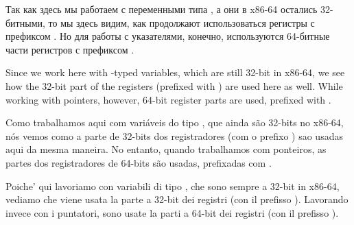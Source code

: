 

\ifdefined\RUSSIAN
Так как здесь мы работаем с переменными типа \Tint, а они в x86-64 остались 32-битными, то мы здесь видим, как продолжают использоваться регистры с префиксом .
Но для работы с указателями, конечно, используются 64-битные части регистров с префиксом .


\fi

\ifdefined\ENGLISH
Since we work here with \Tint{}-typed variables, which are still 32-bit in x86-64, we see how the 32-bit part of the registers (prefixed with ) are used here as well.
While working with pointers, however, 64-bit register parts are used, prefixed with .


\fi

\ifdefined\BRAZILIAN
Como trabalhamos aqui com variáveis do tipo \Tint, que ainda são 32-bits no x86-64, nós vemos como a parte de 32-bits dos registradores (com o prefixo ) sao usadas aqui da mesma maneira.
No entanto, quando trabalhamos com ponteiros, as partes dos registradores de 64-bits são usadas, prefixadas com .


\fi

\ifdefined\ITALIAN
Poiche' qui lavoriamo con variabili di tipo \Tint{}, che sono sempre a 32-bit in x86-64, vediamo che viene usata la parte a 32-bit dei registri (con il prefisso ).
Lavorando invece con i puntatori, sono usate la parti a 64-bit dei registri (con il prefisso ).


\fi